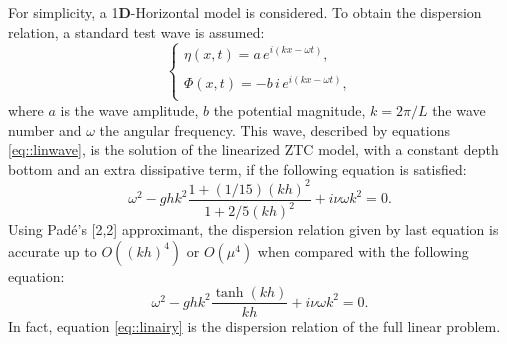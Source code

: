 For simplicity,  a 1{\bf D}-Horizontal  model is  considered. 
To obtain the dispersion relation, 
a standard  test  wave is assumed:
\begin{equation}\label{eq::linwave}
\begin{cases}
\eta(x,t)=a\,e^{i(kx-\omega t)},\\ \\
\Phi(x,t)=-b\,i\,e^{i(kx-\omega t)},\\
\end{cases}
\end{equation}
where \(a\) is the wave amplitude,  \(b\) the potential
magnitude, \(k=2\pi/L\) the wave number and \(\omega\) the angular frequency.
This wave, described by equations \eqref{eq::linwave}, is the
solution of the linearized  ZTC model, with a constant depth
bottom and an extra dissipative term, 
 if the following equation is satisfied:
\begin{equation}\label{eq::dissdisp}
\omega^2-ghk^2\frac{1+(1/15)(kh)^2}{1+2/5(kh)^2}+i\nu\omega k^2=0.
\end{equation}
Using Pad\'{e}'s [2,2] approximant,  the dispersion relation
given by last equation  is accurate up to \(O((kh)^4)\) or \(O(\mu^4)\) when
compared with the following equation:
\begin{equation}\label{eq::linairy}
\omega^2-ghk^2\frac{\tanh(kh)}{kh}+i\nu\omega k^2=0.
\end{equation}
In  fact, equation \eqref{eq::linairy} is the dispersion 
relation of the full linear problem.

